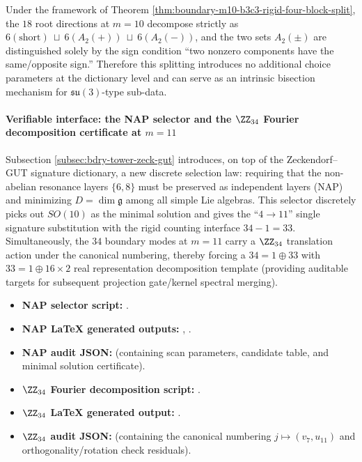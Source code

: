 \begin{remark}\label{rem:boundary-m10-longroot-double-a2-sign-rigidity}
Under the framework of Theorem \ref{thm:boundary-m10-b3c3-rigid-four-block-split},
the \(18\) root directions at \(m=10\) decompose strictly as
\(
6(\mathrm{short})\ \sqcup\ 6(A_2(+))\ \sqcup\ 6(A_2(-))
\), and the two sets \(A_2(\pm)\) are distinguished solely by the sign condition ``two nonzero components have the same/opposite sign.''
Therefore this splitting introduces no additional choice parameters at the dictionary level and can serve as an intrinsic bisection mechanism for \(\mathfrak{su}(3)\)-type sub-data.
\end{remark}

\paragraph{Verifiable interface: the NAP selector and the \texorpdfstring{$\ZZ_{34}$}{Z34} Fourier decomposition certificate at \texorpdfstring{$m=11$}{m=11}}
Subsection \ref{subsec:bdry-tower-zeck-gut} introduces, on top of the Zeckendorf--GUT signature dictionary, a new discrete selection law:
requiring that the non-abelian resonance layers \(\{6,8\}\) must be preserved as independent layers (NAP) and minimizing \(D=\dim\mathfrak g\) among all simple Lie algebras.
This selector discretely picks out \(SO(10)\) as the minimal solution and gives the ``\(4\to 11\)'' single signature substitution with the rigid counting interface \(34-1=33\).
Simultaneously, the \(34\) boundary modes at \(m=11\) carry a \(\ZZ_{34}\) translation action under the canonical numbering, thereby forcing a
\(34=1\oplus 33\) with \(33=1\oplus 16\times 2\) real representation decomposition template (providing auditable targets for subsequent projection gate/kernel spectral merging).
\begin{itemize}
  \item \textbf{NAP selector script:} \texttt{}.
  \item \textbf{NAP LaTeX generated outputs:} \texttt{},
  \texttt{}.
  \item \textbf{NAP audit JSON:} \texttt{} (containing scan parameters, candidate table, and minimal solution certificate).
  \item \textbf{\(\ZZ_{34}\) Fourier decomposition script:} \texttt{}.
  \item \textbf{\(\ZZ_{34}\) LaTeX generated output:} \texttt{}.
  \item \textbf{\(\ZZ_{34}\) audit JSON:} \texttt{} (containing the canonical numbering \(j\mapsto (v_7,u_{11})\) and orthogonality/rotation check residuals).
\end{itemize}


